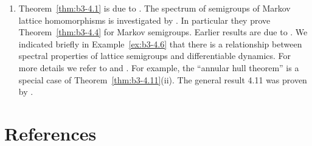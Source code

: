 \begin{enumerate}[label=\emph{Section \arabic*:}, wide]
\item
Theorem~\ref{thm:b3-4.1} is due to \citet{derndinger:1984}.
The spectrum of semigroups of Markov lattice homomorphisms is investigated by \citet{derndingernagel:1979}.
In particular they prove Theorem~\ref{thm:b3-4.4} for Markov semigroups.
Earlier results are due to \citet{scarpellini:1974}.
We indicated briefly in Example~\ref{ex:b3-4.6} that there is a relationship between spectral properties of lattice semigroups and differentiable dynamics.
For more details we refer to \citet{chiconeswanson:1981} and \citet{sackersell:1978}.
For example, the \enquote{annular hull theorem} is a special case of Theorem~\ref{thm:b3-4.11}(ii).
The general result 4.11 was proven by \citet{arendtgreiner:1984}.

\end{enumerate}


\section*{References}
{\RaggedRight
\renewcommand{\bibsection}{}

}
 
 